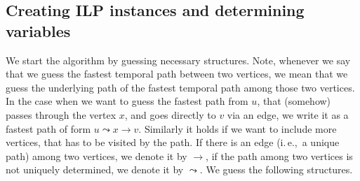 \documentclass[11pt,a4paper]{article}
\theoremstyle{remark}
\theoremstyle{definition}
\newcommand{\ie}{i.\,e.,\ }
\begin{document}
\subsection{Creating ILP instances and determining variables}
We start the algorithm by guessing necessary structures.
Note, whenever we say that we guess the fastest temporal path between two vertices, we mean that we guess the underlying path of the fastest temporal path among those two vertices.
In the case when we want to guess the fastest path from $u$, that (somehow) passes through the vertex $x$, and goes directly to $v$ via an edge, we write it as a fastest path of form $u \leadsto x \rightarrow v$.
Similarly it holds if we want to include more vertices, that has to be visited by the path. If there is an edge (\ie a unique path) among two vertices, we denote it by $\rightarrow$,
if the path among two vertices is not uniquely determined, we denote it by $\leadsto$.
We guess the following structures.
\end{document}
